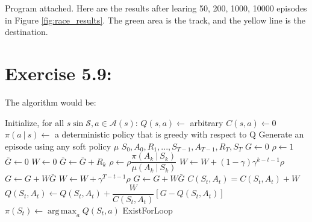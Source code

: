 \documentclass[10pt,letterpaper]{article}
\newcommand\given[1][]{\:#1\vert\:}
\DeclareMathOperator*{\argmax}{arg\,max} %
\begin{document}
Program attached. Here are the results after learing 50, 200, 1000, 10000 episodes in Figure \ref{fig:race_results}. The green area is the track, and the yellow line is the destination.


\section*{Exercise 5.9: }
\label{5.9}

 
The algorithm would be:

\begin{algorithmic}
\State Initialize, for all $s\sin \mathcal{S}, a\in \mathcal{A}(s)$:
\Indent
\State $Q(s,a) \gets$ arbitrary
\State $C(s,a) \gets 0$ 
\State $\pi(a\given s) \gets$ a deterministic policy that is greedy with respect to Q
\EndIndent
\Repeat
\State Generate an episode using any soft policy $\mu$
\Indent
\State $S_0,A_0,R_1,...,S_{T-1},A_{T-1},R_T,S_T$
\EndIndent
\State $G\gets 0$
\State $\rho \gets 1$
\State $\bar{G}\gets 0$
\State $W \gets 0$
\State $\bar{G}\gets \bar{G} + R_k$
\State $\rho \gets \rho\dfrac{\pi(A_k\given S_k)}{\mu(A_k\given S_k)}$
\State $W \gets W +(1-\gamma)\gamma^{k-t-1}\rho$
\State $G\gets G + W\bar{G}$
\EndFor
\State $W \gets W + \gamma^{T-t-1}\rho$
\State $G\gets G + W\bar{G}$
\State $C(S_t, A_t) = C(S_t, A_t) + W$
\State $Q(S_t, A_t) \gets Q(S_t, A_t) + \dfrac{W}{C(S_t,A_t)}[G-Q(S_t, A_t)]$
\State $\pi(S_t) \gets \argmax_a Q(S_t, a)$
\State ExistForLoop
\EndIf
\EndFor
{}
\end{algorithmic}


\clearpage
\end{document}
